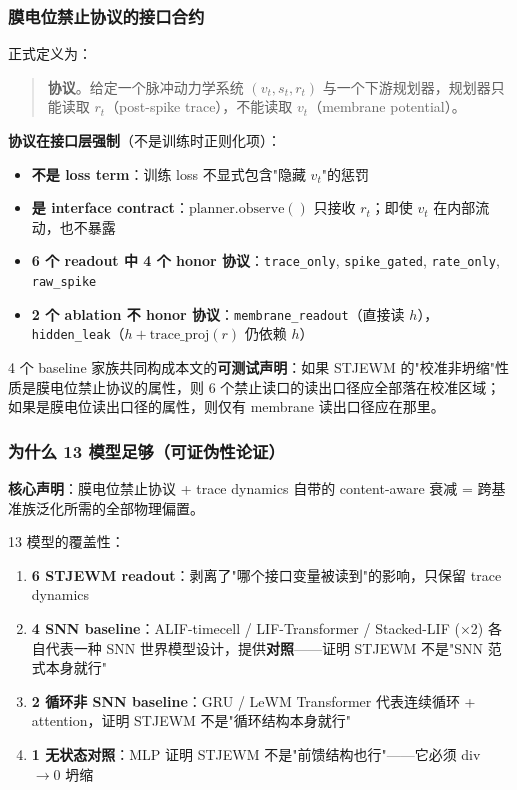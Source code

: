 \documentclass[11pt,a4paper]{article}
\begin{document}
\subsubsection{膜电位禁止协议的接口合约}

正式定义为：
\begin{quote}
\textbf{协议}。给定一个脉冲动力学系统 $(v_t, s_t, r_t)$ 与一个下游规划器，规划器只能读取 $r_t$（post-spike trace），不能读取 $v_t$（membrane potential）。
\end{quote}

\textbf{协议在接口层强制}（不是训练时正则化项）：
\begin{itemize}[leftmargin=2em]
    \item \textbf{不是 loss term}：训练 loss 不显式包含"隐藏 $v_t$"的惩罚
    \item \textbf{是 interface contract}：$\text{planner}.\text{observe}()$ 只接收 $r_t$；即使 $v_t$ 在内部流动，也不暴露
    \item \textbf{6 个 readout 中 4 个 honor 协议}：\texttt{trace\_only}, \texttt{spike\_gated}, \texttt{rate\_only}, \texttt{raw\_spike}
    \item \textbf{2 个 ablation 不 honor 协议}：\texttt{membrane\_readout}（直接读 $h$），\texttt{hidden\_leak}（$h + \text{trace\_proj}(r)$ 仍依赖 $h$）
\end{itemize}

4 个 baseline 家族共同构成本文的\textbf{可测试声明}：如果 STJEWM 的"校准非坍缩"性质是膜电位禁止协议的属性，则 6 个禁止读口的读出口径应全部落在校准区域；如果是膜电位读出口径的属性，则仅有 membrane 读出口径应在那里。

\subsubsection{为什么 13 模型足够（可证伪性论证）}

\textbf{核心声明}：膜电位禁止协议 + trace dynamics 自带的 content-aware 衰减 = 跨基准族泛化所需的全部物理偏置。

13 模型的覆盖性：
\begin{enumerate}[leftmargin=2em]
    \item \textbf{6 STJEWM readout}：剥离了"哪个接口变量被读到"的影响，只保留 trace dynamics
    \item \textbf{4 SNN baseline}：ALIF-timecell / LIF-Transformer / Stacked-LIF (×2) 各自代表一种 SNN 世界模型设计，提供\textbf{对照}——证明 STJEWM 不是"SNN 范式本身就行"
    \item \textbf{2 循环非 SNN baseline}：GRU / LeWM Transformer 代表连续循环 + attention，证明 STJEWM 不是"循环结构本身就行"
    \item \textbf{1 无状态对照}：MLP 证明 STJEWM 不是"前馈结构也行"——它必须 div $\to 0$ 坍缩
\end{enumerate}
\end{document}
